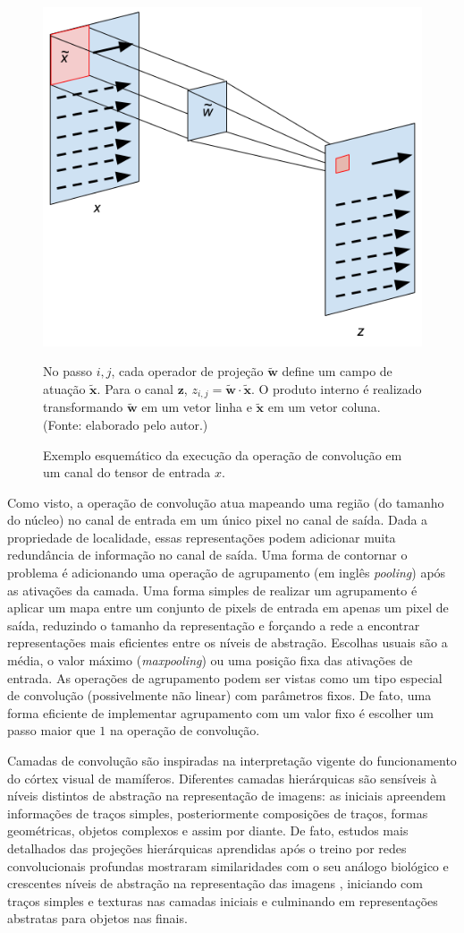 \begin{figure}[ht]
	\caption{Exemplo esquemático da execução da operação de convolução em um canal do tensor de entrada $x$.}
	\begin{center}
	\includegraphics[width=.6\linewidth]{figuras/convwa.png}
	\end{center}
	\small No passo $i,j$, cada operador de projeção $\tilde{\mathbf{w}}$ define um campo de atuação $\tilde{\mathbf{x}}$. Para o canal $\mathbf{z}$, $z_{i,j} = \tilde{\mathbf{w}} \cdot \tilde{\mathbf{x}}$. O produto interno é realizado transformando $\tilde{\mathbf{w}}$ em um vetor linha e $\tilde{\mathbf{x}}$ em um vetor coluna. (Fonte: elaborado pelo autor.)
	\label{convw}
\end{figure}

Como visto, a operação de convolução atua mapeando uma região (do tamanho do núcleo) no canal de entrada em um único pixel no canal de saída. Dada a propriedade de localidade, essas representações podem adicionar muita redundância de informação no canal de saída. Uma forma de contornar o problema é adicionando uma operação de agrupamento (em inglês \textit{pooling}) após as ativações da camada. Uma forma simples de realizar um agrupamento é aplicar um mapa entre um conjunto de pixels de entrada em apenas um pixel de saída, reduzindo o tamanho da representação e forçando a rede a encontrar representações mais eficientes entre os níveis de abstração. Escolhas usuais são a média, o valor máximo (\textit{maxpooling}) ou uma posição fixa das ativações de entrada. As operações de agrupamento podem ser vistas como um tipo especial de convolução (possivelmente não linear) com parâmetros fixos. De fato, uma forma eficiente de implementar agrupamento com um valor fixo é escolher um passo maior que $1$ na operação de convolução.

Camadas de convolução são inspiradas na interpretação vigente do funcionamento do córtex visual de mamíferos. Diferentes camadas hierárquicas são sensíveis à níveis distintos de abstração na representação de imagens: as iniciais apreendem informações de traços simples, posteriormente composições de traços, formas geométricas, objetos complexos e assim por diante. De fato, estudos mais detalhados das projeções hierárquicas aprendidas após o treino por redes convolucionais profundas mostraram similaridades com o seu análogo biológico \cite{lee2008sparse} e crescentes níveis de abstração na representação das imagens \cite{Gatys2015, gatys2016image}, iniciando com traços simples e texturas nas camadas iniciais e culminando em representações abstratas para objetos nas finais.


